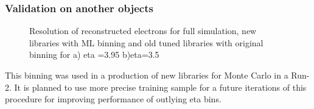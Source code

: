 \subsubsection{Validation on another objects}
\begin{figure}[!tbp]
\begin{minipage}[h]{0.49\linewidth}
\end{minipage}
\hfill
\begin{minipage}[h]{0.49\linewidth}
\end{minipage}
\caption{Resolution of reconstructed electrons for full simulation, new libraries with ML binning and old tuned libraries with original binning for a) eta =3.95 b)eta=3.5 }
\label{fig:OtherVal}
\end{figure}

This binning was used in a production of new libraries for Monte Carlo in a Run-2. It is planned to use more precise training sample for a future iterations of this procedure for improving performance of outlying eta bins.
